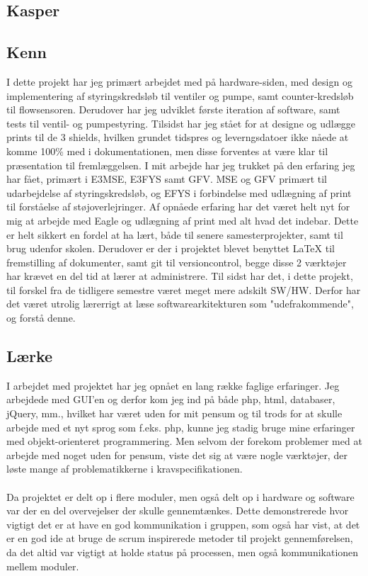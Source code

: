 \subsection{Kasper}

\subsection{Kenn}
I dette projekt har jeg primært arbejdet med på hardware-siden, med design og implementering af styringskredsløb til ventiler og pumpe, samt counter-kredsløb til flowsensoren. Derudover har jeg udviklet første iteration af software, samt tests til ventil- og pumpestyring. Tilsidst har jeg stået for at designe og udlægge prints til de 3 shields, hvilken grundet tidspres og leverngsdatoer ikke nåede at komme 100\% med i dokumentationen, men disse forventes at være klar til præsentation til fremlæggelsen. I mit arbejde har jeg trukket på den erfaring jeg har fået, primært i E3MSE, E3FYS samt GFV. MSE og GFV primært til udarbejdelse af styringskredsløb, og EFYS i forbindelse med udlægning af print til forståelse af støjoverlejringer.\newline
Af opnåede erfaring har det været helt nyt for mig at arbejde med Eagle og udlægning af print med alt hvad det indebar. Dette er helt sikkert en fordel at ha lært, både til senere samesterprojekter, samt til brug udenfor skolen. Derudover er der i projektet blevet benyttet LaTeX til fremstilling af dokumenter, samt git til versioncontrol, begge disse 2 værktøjer har krævet en del tid at lærer at administrere. Til sidst har det, i dette projekt, til forskel fra de tidligere semestre været meget mere adskilt SW/HW. Derfor har det været utrolig lærerrigt at læse softwarearkitekturen som "udefrakommende", og forstå denne.

\subsection{Lærke}
I arbejdet med projektet har jeg opnået en lang række faglige erfaringer. Jeg arbejdede med GUI'en og derfor kom jeg ind på både php, html, databaser, jQuery, mm., hvilket har været uden for mit pensum og til trods for at skulle arbejde med et nyt sprog som f.eks. php, kunne jeg stadig bruge mine erfaringer med objekt-orienteret programmering. Men selvom der forekom problemer med at arbejde med noget uden for pensum, viste det sig at være nogle værktøjer, der løste mange af problematikkerne i kravspecifikationen.
\\\\
Da projektet er delt op i flere moduler, men også delt op i hardware og software var der en del overvejelser der skulle gennemtænkes. Dette demonstrerede hvor vigtigt det er at have en god kommunikation i gruppen, som også har vist, at det er en god ide at bruge de scrum inspirerede metoder til projekt gennemførelsen, da det altid var vigtigt at holde status på processen, men også kommunikationen mellem moduler. 

